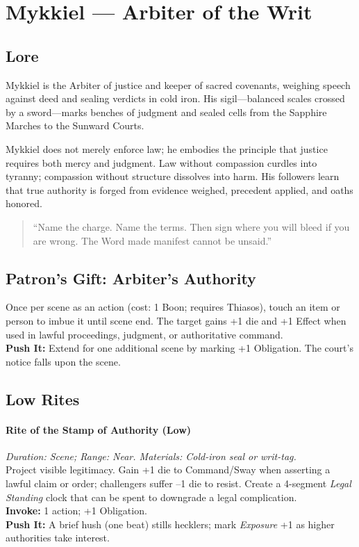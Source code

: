 \section{Mykkiel — Arbiter of the Writ}
\label{patron:mykkiel}

\subsection*{Lore}
%
Mykkiel is the Arbiter of justice and keeper of sacred covenants, weighing speech against deed and sealing verdicts in cold iron. His sigil—balanced scales crossed by a sword—marks benches of judgment and sealed cells from the Sapphire Marches to the Sunward Courts. 

Mykkiel does not merely enforce law; he embodies the principle that justice requires both mercy and judgment. Law without compassion curdles into tyranny; compassion without structure dissolves into harm. His followers learn that true authority is forged from evidence weighed, precedent applied, and oaths honored.

\begin{quote}
``Name the charge. Name the terms. Then sign where you will bleed if you are wrong. The Word made manifest cannot be unsaid.''
\end{quote}

\subsection*{Patron's Gift: Arbiter's Authority}
Once per scene as an action (cost: 1 Boon; requires Thiasos), touch an item or person to imbue it until scene end. The target gains +1 die and +1 Effect when used in lawful proceedings, judgment, or authoritative command.\\
\textbf{Push It:} Extend for one additional scene by marking +1 Obligation. The court’s notice falls upon the scene.

\subsection*{Low Rites}

\paragraph{Rite of the Stamp of Authority (Low)}%
\emph{Duration: Scene; Range: Near. Materials: Cold-iron seal or writ-tag.}\\
Project visible legitimacy. Gain +1 die to Command/Sway when asserting a lawful claim or order; challengers suffer --1 die to resist. Create a 4-segment \emph{Legal Standing} clock that can be spent to downgrade a legal complication.\\
\textbf{Invoke:} 1 action; +1 Obligation.\\
\textbf{Push It:} A brief hush (one beat) stills hecklers; mark \emph{Exposure} +1 as higher authorities take interest.


